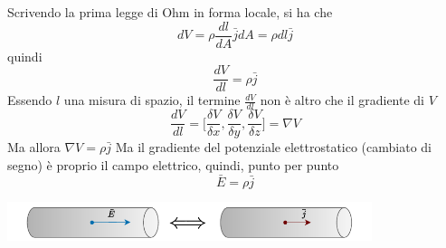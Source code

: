 \documentclass[10pt, letterpaper]{report}
\begin{document}
Scrivendo la prima legge di Ohm in forma locale, si ha che 
$$dV=\rho\frac{dl}{dA}\bar j dA=\rho dl\bar j $$
quindi 
$$ \frac{dV}{dl}=\rho \bar j$$
Essendo $l$ una misura di spazio, il termine $\frac{dV}{dl}$ non è altro che il gradiente di $V$
$$ \frac{dV}{dl}=\Bigg [
    \frac{\delta V}{\delta x},\frac{\delta V}{\delta y},\frac{\delta V}{\delta z}
\Bigg]=\nabla V$$
Ma allora $\nabla V = \rho \bar j$
Ma il gradiente del potenziale elettrostatico (cambiato di segno) è proprio il campo elettrico, quindi, punto per punto 
$$ \bar E = \rho \bar j$$
\begin{center}
    \includegraphics[width=0.8\textwidth]{images/campoCorrente.pdf}
\end{center}
\end{document}
